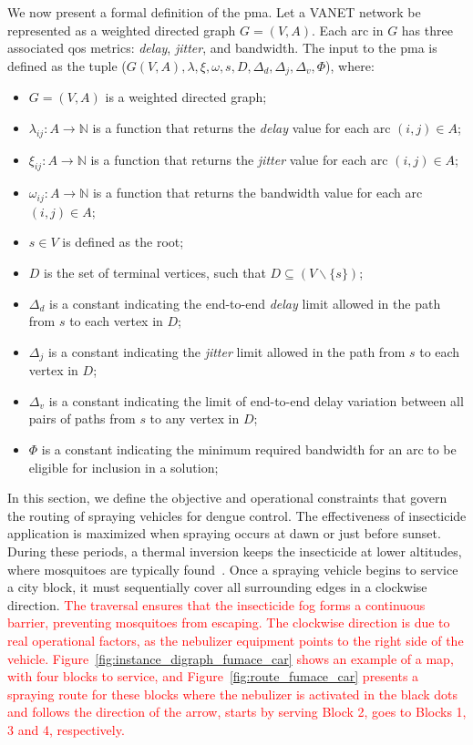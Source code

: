 We now present a formal definition of the \gls{pma}. Let a VANET network be represented as a weighted directed graph $G = (V, A)$. Each arc in $G$ has three associated \gls{qos} metrics: \textit{delay}, \textit{jitter}, and bandwidth. The input to the \gls{pma} is defined as the tuple ($G(V, A), \lambda, \xi, \omega, s, D, \Delta_{d}, \Delta_{j}, \Delta_{v}, \Phi$), where:

\begin{itemize}
    \item $G = (V, A)$ is a weighted directed graph;
    \item $\lambda_{ij} : A \rightarrow \mathbb{N}$ is a function that returns the \textit{delay} value for each arc $(i, j) \in A$;
    \item $\xi_{ij} : A \rightarrow \mathbb{N}$ is a function that returns the \textit{jitter} value for each arc $(i, j) \in A$;
    \item $\omega_{ij} : A \rightarrow \mathbb{N}$ is a function that returns the bandwidth value for each arc $(i, j) \in A$;
    \item $s \in V$ is defined as the root;
    \item $D$ is the set of terminal vertices, such that $D \subseteq (V \backslash \{s\})$;
    \item $\Delta_{d}$ is a constant indicating the end-to-end \textit{delay} limit allowed in the path from $s$ to each vertex in $D$;
    \item $\Delta_{j}$ is a constant indicating the \textit{jitter} limit allowed in the path from $s$ to each vertex in $D$;
    \item $\Delta_{v}$ is a constant indicating the limit of end-to-end delay variation between all pairs of paths from $s$ to any vertex in $D$;
    \item $\Phi$ is a constant indicating the minimum required bandwidth for an arc to be eligible for inclusion in a solution;
\end{itemize}

In this section, we define the objective and operational constraints that govern the routing of spraying vehicles for dengue control. The effectiveness of insecticide application is maximized when spraying occurs at dawn or just before sunset. During these periods, a thermal inversion keeps the insecticide at lower altitudes, where mosquitoes are typically found~\citep{MS}. Once a spraying vehicle begins to service a city block, it must sequentially cover all surrounding edges in a clockwise direction. \textcolor{red}{The traversal ensures that the insecticide fog forms a continuous barrier, preventing mosquitoes from escaping. The clockwise direction is due to real operational factors, as the nebulizer equipment points to the right side of the vehicle.
Figure~\ref{fig:instance_digraph_fumace_car} shows an example of a map,
with four blocks to service, and Figure~\ref{fig:route_fumace_car} presents a spraying route for these blocks where the nebulizer is activated in the black dots and follows the direction of the arrow, starts by serving Block 2, goes to Blocks 1, 3 and 4, respectively.
}

